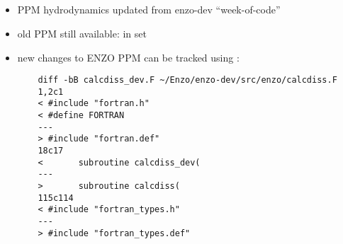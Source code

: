 \NEWSEC



\subsection{\ssRecentPpmDevel}

\begin{frame}[fragile,label=ss-recent-ppm-devel] 
\secframetitle{\ssRecentPpmDevel}
\begin{itemize}
\item PPM hydrodynamics updated from enzo-dev ``week-of-code''
\item old PPM still available: in  set 
\item new changes to ENZO PPM can be tracked using :
\footnotesize
\begin{verbatim}
    diff -bB calcdiss_dev.F ~/Enzo/enzo-dev/src/enzo/calcdiss.F 
    1,2c1
    < #include "fortran.h"
    < #define FORTRAN
    ---
    > #include "fortran.def"
    18c17
    <       subroutine calcdiss_dev(
    ---
    >       subroutine calcdiss(
    115c114
    < #include "fortran_types.h"
    ---
    > #include "fortran_types.def"
\end{verbatim}
\end{itemize}

\end{frame}

